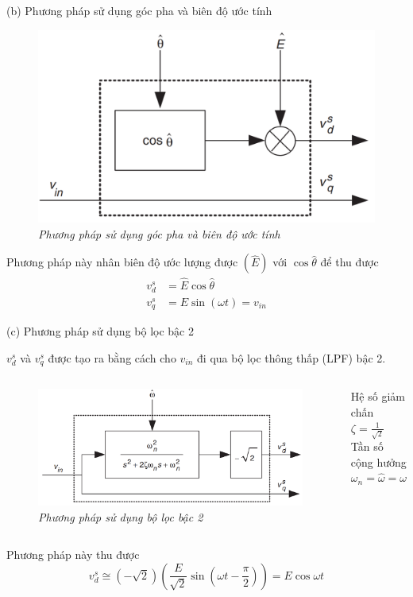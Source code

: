 \documentclass[11pt]{beamer}
\renewcommand{\label}[1]{%
			\gdef\sfname{sf:##1}}%
\begin{document}
\begin{frame}[t]{(b) Phương pháp sử dụng góc pha và biên độ ước tính}	
	\begin{figure}[h]
		\includegraphics[width=.6\textwidth]{Fig. 5 Method using estimated phase angle and amplitude.PNG}
		\caption{\centering \textit{Phương pháp sử dụng góc pha và biên độ ước tính}}
		\label{fig:Phương pháp sử dụng góc pha và biên độ ước tính}
	\end{figure}
	Phương pháp này nhân biên độ ước lượng được $(\hat{E})$ với $\cos{\hat{\theta}}$ để thu được
	\begin{align*}
		v_d^s &= \hat{E} \cos{\hat{\theta}}\\
		{v}_q^s &=E\sin({\omega t})=v_{in}
	\end{align*}
	
\end{frame}

\begin{frame}[t]{(c)  Phương pháp sử dụng bộ lọc bậc 2}
	
	$v_d^s$ và $v_q^s$ được tạo ra bằng cách cho $v_{in}$ đi qua bộ lọc thông thấp (LPF) bậc 2.
	
	 \begin{columns}
			\centering
			\begin{figure}[h]
				\includegraphics[width=1\textwidth]{Fig. 6 Method using second-order low-pass filter.PNG}
				\caption{\centering \textit{ Phương pháp sử dụng bộ lọc bậc 2}}
				\label{fig: Phương pháp sử dụng bộ lọc bậc 2}
			\end{figure}
			Hệ số giảm chấn $\zeta = \frac{1}{\sqrt{2}}$\\
			Tần số cộng hưởng ${\omega}_n = \hat{\omega} = \omega$
	\end{columns}
	
	
	Phương pháp này thu được
	$$v_d^s \cong {(-\sqrt{2}) \left( \frac{E}{\sqrt{2}} \sin{(\omega t - \frac{\pi}{2} )} \right) = E\cos{\omega t} }$$
	
\end{frame}
\end{document}
